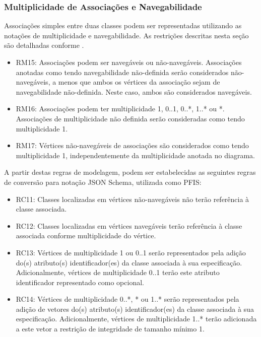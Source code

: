 
\subsubsection{Multiplicidade de Associações e Navegabilidade}

Associações simples entre duas classes podem ser representadas utilizando as notações de multiplicidade e navegabilidade. As restrições descritas nesta seção são detalhadas conforme .

\begin{itemize}
    \item RM15: Associações podem ser navegáveis ou não-navegáveis. Associações anotadas como tendo navegabilidade não-definida serão considerados não-navegáveis, a menos que ambos os vértices da associação sejam de navegabilidade não-definida. Neste caso, ambos são considerados navegáveis.
    
    \item RM16: Associações podem ter multiplicidade 1, 0..1, 0..*, 1..* ou *. Associações de multiplicidade não definida serão consideradas como tendo multiplicidade 1.
    
    \item RM17: Vértices não-navegáveis de associações são considerados como tendo multiplicidade 1, independentemente da multiplicidade anotada no diagrama.
\end{itemize}

A partir destas regras de modelagem, podem ser estabelecidas as seguintes regras de conversão para notação JSON Schema, utilizada como PFIS:

\begin{itemize}
    \item RC11: Classes localizadas em vértices não-navegáveis não terão referência à classe associada.
    
    \item RC12: Classes localizadas em vértices navegáveis terão referência à classe associada conforme multiplicidade do vértice.
    
    \item RC13: Vértices de multiplicidade 1 ou 0..1 serão representados pela adição do(s) atributo(s) identificador(es) da classe associada à sua especificação. Adicionalmente, vértices de multiplicidade 0..1 terão este atributo identificador representado como opcional.
    
    \item RC14: Vértices de multiplicidade 0..*, * ou 1..* serão representados pela adição de vetores do(s) atributo(s) identificador(es) da classe associada à sua especificação. Adicionalmente, vértices de multiplicidade 1..* terão adicionada a este vetor a restrição de integridade de tamanho mínimo 1.
\end{itemize}

